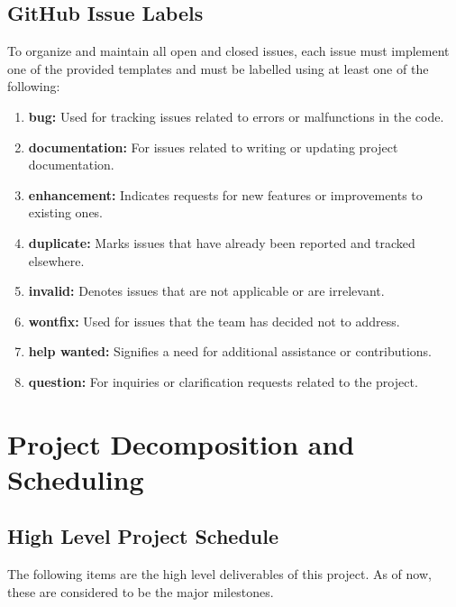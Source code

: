 \documentclass{article}
\begin{document}
\subsection*{GitHub Issue Labels}

To organize and maintain all open and closed issues, each issue must implement
one of the provided templates and must be labelled using at least one of the
following:

\begin{enumerate}
    \item \textbf{bug:} Used for tracking issues related to errors or
    malfunctions in the code.
    \item \textbf{documentation:} For issues related to writing or updating
    project documentation.
    \item \textbf{enhancement:} Indicates requests for new features or
    improvements to existing ones.
    \item \textbf{duplicate:} Marks issues that have already been reported and
    tracked elsewhere.
    \item \textbf{invalid:} Denotes issues that are not applicable or are
    irrelevant.
    \item \textbf{wontfix:} Used for issues that the team has decided not to
    address.
    \item \textbf{help wanted:} Signifies a need for additional assistance or
    contributions.
    \item \textbf{question:} For inquiries or clarification requests related to
    the project.
\end{enumerate}

\section{Project Decomposition and Scheduling}

\subsection*{High Level Project Schedule}
The following items are the high level deliverables of this project. As of now,
these are considered to be the major milestones.
\end{document}
